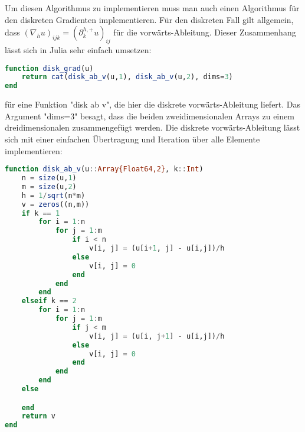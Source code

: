 \documentclass{article}
\theoremstyle{case}
\begin{document}
Um diesen Algorithmus zu implementieren muss man auch einen Algorithmus für den diskreten Gradienten implementieren. Für den diskreten Fall gilt allgemein, dass $(\nabla_{h} u)_{ijk} = ( \partial_{k}^{h,+} u)_{ij}$ für die vorwärts-Ableitung. Dieser Zusammenhang lässt sich in Julia sehr einfach umsetzen:
\begin{lstlisting}[language=Julia]
function disk_grad(u)
	return cat(disk_ab_v(u,1), disk_ab_v(u,2), dims=3)
end
\end{lstlisting}
für eine Funktion "disk ab v", die hier die diskrete vorwärts-Ableitung liefert. Das Argument "dims=3" besagt, dass die beiden zweidimensionalen Arrays zu einem dreidimensionalen zusammengefügt werden. Die diskrete vorwärts-Ableitung lässt sich mit einer einfachen Übertragung und Iteration über alle Elemente implementieren:
\begin{lstlisting}[language=Julia]
function disk_ab_v(u::Array{Float64,2}, k::Int)
	n = size(u,1)
	m = size(u,2)
	h = 1/sqrt(n*m)
	v = zeros((n,m))
	if k == 1
		for i = 1:n
			for j = 1:m
				if i < n
					v[i, j] = (u[i+1, j] - u[i,j])/h
				else
					v[i, j] = 0
				end
			end
		end
	elseif k == 2
		for i = 1:n
			for j = 1:m
				if j < m
					v[i, j] = (u[i, j+1] - u[i,j])/h
				else
					v[i, j] = 0
				end
			end
		end
	else

	end
	return v
end
\end{lstlisting}



\end{document}
